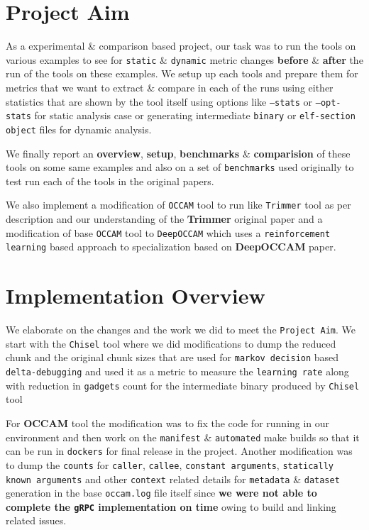\documentclass{relatorio}
\begin{document}
\section{Project Aim}%
\label{Tools}

As a experimental \& comparison based project, our task was to run the tools on various examples to see for \texttt{static} 
\& \texttt{dynamic} metric changes \textbf{before} \& \textbf{after} the run of the tools on these examples. 
We setup up each tools and prepare them for metrics that we want to extract \& compare in each of the runs using either 
statistics that are shown by the tool itself using options like \texttt{--stats} or \texttt{--opt-stats} for static analysis case 
or generating intermediate \texttt{binary} or \texttt{elf-section object} files for dynamic analysis.

We finally report an \textbf{overview}, \textbf{setup}, \textbf{benchmarks} \& \textbf{comparision} of these tools on some same 
examples and also on a set of \texttt{benchmarks} used originally to test run each of the tools in the original papers. 

We also implement a modification of \texttt{OCCAM} tool to run like \texttt{Trimmer} tool as per description and our understanding 
of the \textbf{Trimmer} original paper and a modification of base \texttt{OCCAM} tool to \texttt{DeepOCCAM} which uses a 
\texttt{reinforcement learning} based approach to specialization based on \textbf{DeepOCCAM} paper. 

\section{Implementation Overview}%
\label{Tools}

We elaborate on the changes and the work we did to meet the \texttt{Project Aim}. We start with the \texttt{Chisel} tool where we did modifications to dump the reduced chunk and the original chunk sizes that are used for \texttt{markov decision} based \texttt{delta-debugging} and used it as a metric to measure the \texttt{learning rate} along with reduction in \texttt{gadgets} count for the intermediate binary produced by \texttt{Chisel} tool

For \textbf{OCCAM} tool the modification was to fix the code for running in our environment and then work on the \texttt{manifest} \& \texttt{automated} make builds so that it can be run in \texttt{dockers} for final release in the project. Another modification was to dump the \texttt{counts} for \texttt{caller}, \texttt{callee}, \texttt{constant arguments}, \texttt{statically known arguments} and other \texttt{context} related details for 
\texttt{metadata} \& \texttt{dataset} generation in the base \texttt{occam.log} file itself since \textbf{we were not able to complete the \texttt{gRPC} implementation on time} owing to build and linking related issues. 
\end{document}
